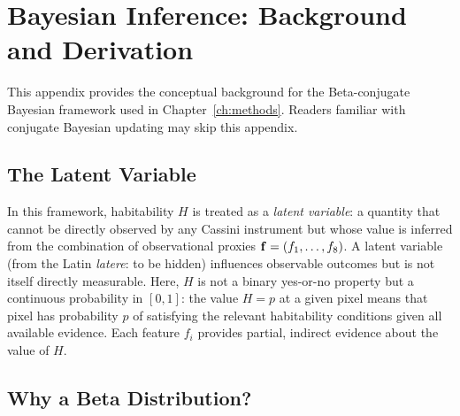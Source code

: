 
\chapter{Bayesian Inference: Background and Derivation}
\label{app:bayes_pedagogy}

This appendix provides the conceptual background for the Beta-conjugate
Bayesian framework used in Chapter~\ref{ch:methods}. Readers familiar
with conjugate Bayesian updating may skip this appendix.

\section{The Latent Variable}
\label{sec:latent_variable}

In this framework, habitability $H$ is treated as a \textit{latent variable}:
a quantity that cannot be directly observed by any Cassini instrument but
whose value is inferred from the combination of observational proxies
$\mathbf{f} = (f_1, \ldots, f_8)$.  A latent variable (from the Latin
\textit{latere}: to be hidden) influences observable outcomes but is not
itself directly measurable.  Here, $H$ is not a binary yes-or-no property
but a continuous probability in $[0, 1]$: the value $H = p$ at a given pixel
means that pixel has probability $p$ of satisfying the relevant habitability
conditions given all available evidence.  Each feature $f_i$ provides partial,
indirect evidence about the value of $H$.

\section{Why a Beta Distribution?}
\label{sec:why_beta}


